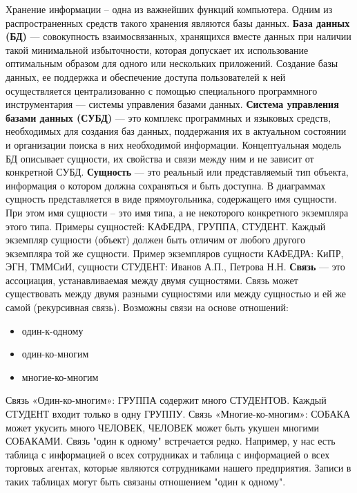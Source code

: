 \documentclass[a4paper]{article}
\begin{document}
Хранение информации – одна из важнейших функций компьютера. Одним из распространенных средств такого хранения являются базы данных.\linebreak
\textbf{База данных (БД)} --- совокупность взаимосвязанных, хранящихся вместе данных при наличии такой минимальной избыточности, которая допускает их использование оптимальным образом для одного или нескольких приложений. Создание базы данных, ее поддержка и обеспечение доступа пользователей к ней осуществляется централизованно с помощью специального программного инструментария --- системы управления базами данных.\linebreak
\textbf{Система управления базами данных (СУБД)} --- это комплекс программных и языковых средств, необходимых для создания баз данных, поддержания их в актуальном состоянии и организации поиска в них необходимой информации. Концептуальная модель БД описывает сущности, их свойства и связи между ним и не зависит от конкретной СУБД.\linebreak
\textbf{Сущность} --- это реальный или представляемый тип объекта, информация о котором должна сохраняться и быть доступна. В диаграммах сущность представляется в виде прямоугольника, содержащего имя сущности. При этом имя сущности – это имя типа, а не некоторого конкретного экземпляра этого типа. Примеры сущностей: КАФЕДРА, ГРУППА, СТУДЕНТ. Каждый экземпляр сущности (объект) должен быть отличим от любого другого экземпляра той же сущности. Пример экземпляров сущности КАФЕДРА: КиПР, ЭГН, ТММСиИ, сущности СТУДЕНТ: Иванов А.П., Петрова Н.Н. \linebreak
\textbf{Связь} --- это ассоциация, устанавливаемая между двумя сущностями. Связь может существовать между двумя разными сущностями или между сущностью и ей же самой (рекурсивная связь). Возможны связи на основе отношений:
\begin{itemize}
    \item один-к-одному
    \item один-ко-многим
    \item многие-ко-многим
\end{itemize}

Связь «Один-ко-многим»: ГРУППА содержит много СТУДЕНТОВ. Каждый СТУДЕНТ входит только в одну ГРУППУ. Связь «Многие-ко-многим»: СОБАКА может укусить много ЧЕЛОВЕК, ЧЕЛОВЕК может быть укушен многими СОБАКАМИ. Связь "один к одному" встречается редко. Например, у нас есть таблица с информацией о всех сотрудниках и таблица с информацией о всех торговых агентах, которые являются сотрудниками нашего предприятия. Записи в таких таблицах могут быть связаны отношением "один к одному".
\end{document}
